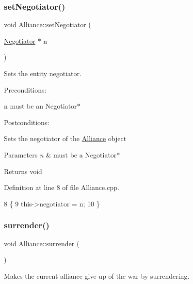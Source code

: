 \subsubsection{\texorpdfstring{set\+Negotiator()}{setNegotiator()}}
{\footnotesize\ttfamily void Alliance\+::set\+Negotiator (\begin{DoxyParamCaption}\item[{\hyperlink{classNegotiator}{Negotiator} $\ast$}]{n }\end{DoxyParamCaption})}



Sets the entity negotiator. 

Preconditions\+:
\begin{DoxyItemize}
\item n must be an Negotiator$\ast$
\end{DoxyItemize}

Postconditions\+:
\begin{DoxyItemize}
\item Sets the negotiator of the \hyperlink{classAlliance}{Alliance} object
\end{DoxyItemize}


\begin{DoxyParams}{Parameters}
{\em n} & must be a Negotiator$\ast$ \\
\hline
\end{DoxyParams}
\begin{DoxyReturn}{Returns}
void 
\end{DoxyReturn}


Definition at line 8 of file Alliance.\+cpp.


\begin{DoxyCode}
8                                           \{
9     this->negotiator = n;
10 \}
\end{DoxyCode}
\mbox{\label{classAlliance_ad3b8272ccec63d3a32b7e241434948e9}} 
\subsubsection{\texorpdfstring{surrender()}{surrender()}}
{\footnotesize\ttfamily void Alliance\+::surrender (\begin{DoxyParamCaption}{ }\end{DoxyParamCaption})}



Makes the current alliance give up of the war by surrendering. 

